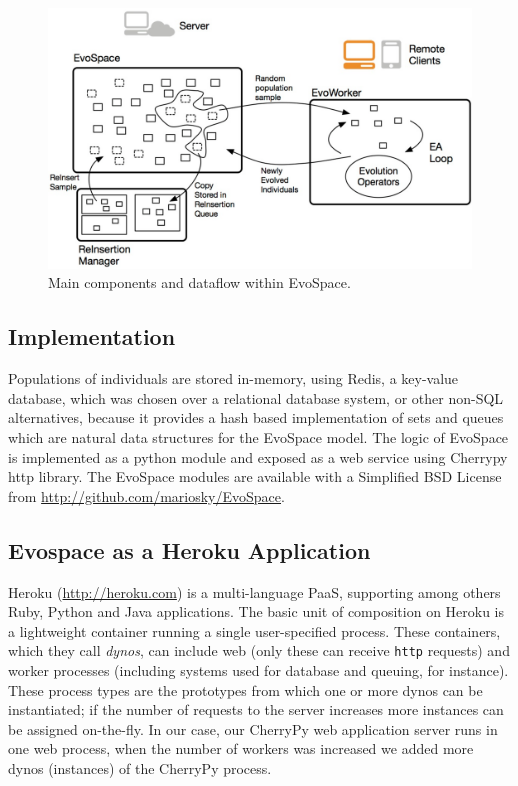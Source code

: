 \documentclass{llncs}
\begin{document}
\begin{figure}[t]
    \centering
        \includegraphics[width=4.5in]{evospaceExample.eps}
    \caption{Main components and dataflow within EvoSpace.}
    \label{fig:evo}
\end{figure}


\subsection{Implementation}
Populations of individuals are stored in-memory, using Redis, a
key-value database, which 
 was chosen over a relational database system, or other non-SQL 
alternatives, because it provides a hash based implementation of sets 
and queues which are natural data structures for the EvoSpace model. 
The logic of EvoSpace is implemented as a python module and exposed as a web 
service using Cherrypy http library. The EvoSpace modules are available with 
a Simplified BSD License from 
\url{http://github.com/mariosky/EvoSpace}.

\subsection{Evospace as a Heroku Application}

Heroku (\url{http://heroku.com}) is a multi-language PaaS, supporting among others
Ruby, Python and Java applications. The basic unit of composition on
Heroku is a lightweight container running a single user-specified
process. These containers, which they call {\em dynos}, can include web
(only these can receive {\tt http} requests) and worker processes
(including systems used for database and queuing, for instance).
These  process types are the prototypes from which one or more dynos 
can be instantiated; if the number of requests to the server increases
more instances can be assigned on-the-fly. In our case, our CherryPy 
web application server runs in one web process, when the number 
of workers was increased we added more dynos (instances) of the 
CherryPy process.
\end{document}
